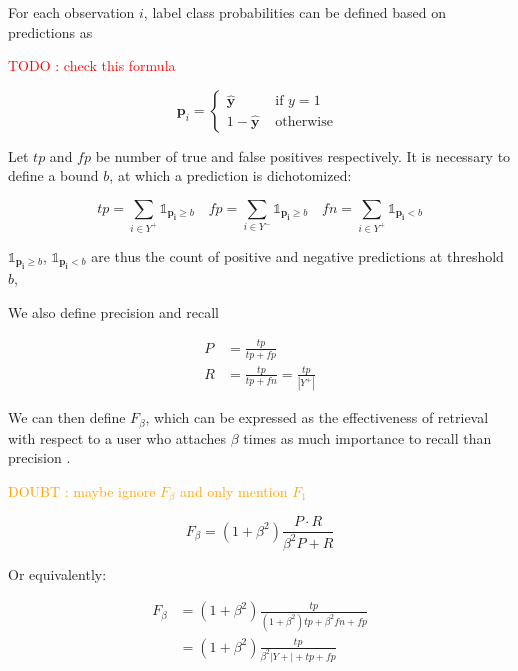 \documentclass[sigconf,natbib,screen=true,review=true,anonymous]{acmart}
\newcommand\todo[1]{\textcolor{red}{TODO : #1}}
\newcommand\doubt[1]{\textcolor{orange}{DOUBT : #1}}
\begin{document}
For each observation \(i\), label class probabilities can be defined based on predictions as

\todo{check this formula}

\begin{equation}
\mathbf{p}_{i}=\left\{\begin{array}{ll}\hat{\mathbf{y}} & \text { if } y=1 \\ 1-\hat{\mathbf{y}} & \text { otherwise }\end{array}\right.
\end{equation}

Let \(tp\) and \(fp\) be number of true and false positives respectively. It is necessary to define a bound \(b\), at which a prediction is dichotomized:

\begin{equation}
\label{eq:conf}
 t p=\sum_{i \in Y^{+}} \mathds{1}_{\mathbf{p_i} \geq b} \quad f p=\sum_{i \in Y^{-}} \mathds{1}_{\mathbf{p_i} \geq b} \quad fn = \sum_{i \in Y^{+}} \mathds{1}_{\mathbf{p_i} < b}
\end{equation}

\(\mathds{1}_{\mathbf{p_i} \geq b}\), \(\mathds{1}_{\mathbf{p_i} < b}\) are thus the count of positive and negative predictions at threshold \(b\), 

We also define precision and recall

\begin{equation}
\begin{aligned} P &=\frac{t p}{t p+f p} \\ R &=\frac{t p}{t p+f n}=\frac{t p}{\left|Y^{+}\right|} \end{aligned}
\end{equation}

We can then define \(F_\beta\), which can be expressed as the effectiveness of retrieval with respect to a user who attaches \(\beta\) times as much importance to recall than precision \cite{informationRetrieval}.

\doubt{maybe ignore $F_\beta$ and only mention $F_1$}

\begin{equation}
F_{\beta}=\left(1+\beta^{2}\right) \frac{P \cdot R}{\beta^{2} P+R}
\end{equation}

Or equivalently:

\begin{equation}
\begin{aligned} F_{\beta} &=\left(1+\beta^{2}\right) \frac{t p}{\left(1+\beta^{2}\right) t p+\beta^{2} f n+f p} \\ &=\left(1+\beta^{2}\right) \frac{t p}{\beta^{2}|Y+|+t p+f p} \end{aligned}
\end{equation}
\end{document}

